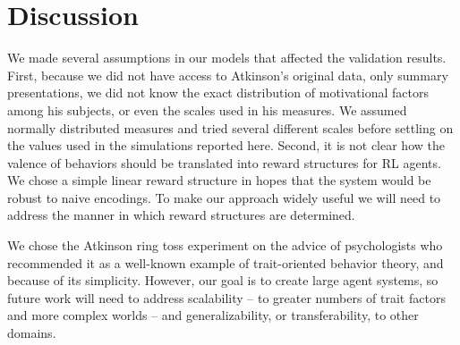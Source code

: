 \section{Discussion}

We made several assumptions in our models that affected the validation results.  First, because we did not have access to Atkinson's original data, only summary presentations, we did not know the exact distribution of motivational factors among his subjects, or even the scales used in his measures.  We assumed normally distributed measures and tried several different scales before settling on the values used in the simulations reported here.  Second, it is not clear how the valence of behaviors should be translated into reward structures for RL agents.  We chose a simple linear reward structure in hopes that the system would be robust to naive encodings.  To make our approach widely useful we will need to address the manner in which reward structures are determined.


We chose the Atkinson ring toss experiment on the advice of psychologists who recommended it as a well-known example of trait-oriented behavior theory, and because of its simplicity. However, our goal is to create large agent systems, so future work will need to address scalability -- to greater numbers of trait factors and more complex worlds -- and generalizability, or transferability, to other domains.



